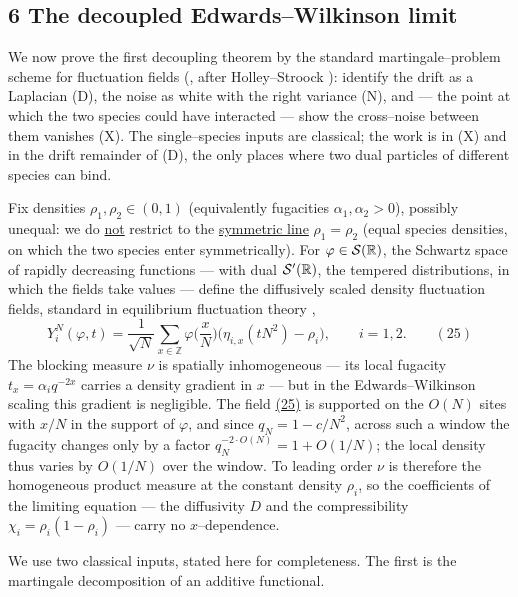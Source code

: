 \documentclass[11pt]{article}
\theoremstyle{plain}
\theoremstyle{definition}
\theoremstyle{remark}
\newcommand{\Z}{\mathbb{Z}}\newcommand{\R}{\mathbb{R}}\newcommand{\N}{\mathbb{N}}
\begin{document}
\subsection{6 The decoupled Edwards--Wilkinson limit}\label{sec_ew}

We now prove the first decoupling theorem by the standard martingale--problem scheme for
fluctuation fields (\cite[Ch.~11]{KL}, after Holley--Stroock \cite{HolleyStroock}):
identify the drift as a Laplacian (D), the noise as white with the
right variance (N), and --- the point at which the two species could have interacted ---
show the cross--noise between them vanishes (X). The single--species inputs are
classical; the work is in (X) and in the drift remainder of (D), the only places where
two dual particles of different species can bind.

Fix densities $\rho_1,\rho_2\in(0,1)$ (equivalently fugacities $\alpha_1,\alpha_2>0$),
possibly unequal: we do \underline{not} restrict to the \underline{symmetric line} $\rho_1=\rho_2$
(equal species densities, on which the two species enter symmetrically). For
$\varphi\in\cS(\R)$, the Schwartz space of rapidly decreasing functions --- with dual
$\cS'(\R)$, the tempered distributions, in which the fields take values --- define the
diffusively scaled density fluctuation fields, standard in equilibrium fluctuation
theory \cite[Ch.~11]{KL},
\label{eq_field}
\begin{equation}
  Y_i^N(\varphi,t)=\frac1{\sqrt N}\sum_{x\in\Z}\varphi\Big(\frac xN\Big)
   \big(\eta_{i,x}(tN^2)-\rho_i\big),\qquad i=1,2.\qquad(25)
\end{equation}
The blocking measure $\nu$ is spatially inhomogeneous --- its local fugacity
$t_x=\alpha_i q^{-2x}$ carries a density gradient in $x$ --- but in the
Edwards--Wilkinson scaling this gradient is negligible. The field \hyperref[eq_field]{(25)} is
supported on the $O(N)$ sites with $x/N$ in the support of $\varphi$, and since
$q_N=1-c/N^2$, across such a window the fugacity changes only by a factor
$q_N^{-2\cdot O(N)}=1+O(1/N)$; the local density thus varies by $O(1/N)$ over the
window. To leading order $\nu$ is therefore the homogeneous product measure at the
constant density $\rho_i$, so the coefficients of the limiting equation --- the
diffusivity $D$ and the compressibility $\chi_i=\rho_i(1-\rho_i)$ --- carry no
$x$--dependence.

We use two classical inputs, stated here for completeness. The first is the martingale
decomposition of an additive functional.
\end{document}
